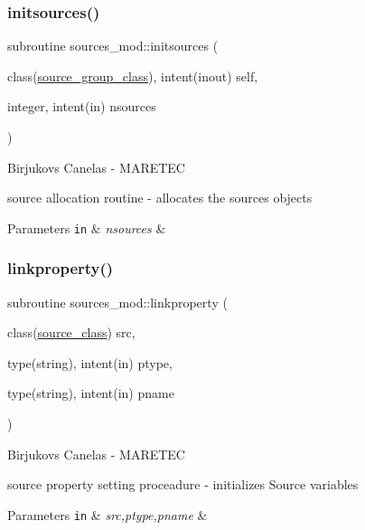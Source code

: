 \subsubsection{\texorpdfstring{initsources()}{initsources()}}
{\footnotesize\ttfamily subroutine sources\+\_\+mod\+::initsources (\begin{DoxyParamCaption}\item[{class(\hyperlink{structsources__mod_1_1source__group__class}{source\+\_\+group\+\_\+class}), intent(inout)}]{self,  }\item[{integer, intent(in)}]{nsources }\end{DoxyParamCaption})\hspace{0.3cm}{\ttfamily [private]}}



Birjukovs Canelas -\/ M\+A\+R\+E\+T\+EC 

source allocation routine -\/ allocates the sources objects 
\begin{DoxyParams}[1]{Parameters}
\mbox{\tt in}  & {\em nsources} & \\
\hline
\end{DoxyParams}
\mbox{\label{namespacesources__mod_a683ca7e4aca7a0050aad9f506569fca9}} 
\subsubsection{\texorpdfstring{linkproperty()}{linkproperty()}}
{\footnotesize\ttfamily subroutine sources\+\_\+mod\+::linkproperty (\begin{DoxyParamCaption}\item[{class(\hyperlink{structsources__mod_1_1source__class}{source\+\_\+class})}]{src,  }\item[{type(string), intent(in)}]{ptype,  }\item[{type(string), intent(in)}]{pname }\end{DoxyParamCaption})\hspace{0.3cm}{\ttfamily [private]}}



Birjukovs Canelas -\/ M\+A\+R\+E\+T\+EC 

source property setting proceadure -\/ initializes Source variables 
\begin{DoxyParams}[1]{Parameters}
\mbox{\tt in}  & {\em src,ptype,pname} & \\
\hline
\end{DoxyParams}
\mbox{\label{namespacesources__mod_a641fe9ecc295e486a714c1aaa133d991}} 

